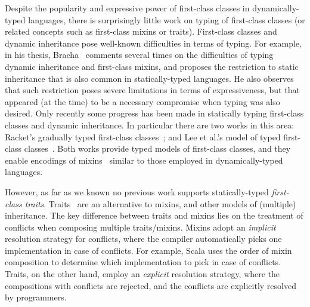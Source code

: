 Despite the popularity and expressive power of first-class classes in dynamically-typed
languages, there is surprisingly little work on typing of first-class
classes (or related concepts such as first-class mixins or traits).
First-class classes and dynamic inheritance pose well-known
difficulties in terms of typing. For example, in his thesis,
Bracha~\citep{bracha1992programming} comments several times on the difficulties of typing
dynamic inheritance and first-class mixins, and proposes the
restriction to static inheritance that is also common in
statically-typed languages. He also observes that such restriction
poses severe limitations in terms of expressiveness, but that appeared
(at the time)
to be a necessary compromise when typing was also desired.
Only recently some progress has been made in statically typing 
first-class classes and dynamic inheritance. In particular there are
two works in this area: Racket's gradually
typed first-class classes~\citep{DBLP:conf/oopsla/TakikawaSDTF12}; and Lee et al.'s model of
typed first-class classes~\citep{DBLP:conf/ecoop/LeeASP15}. Both works provide typed models of
first-class classes, and they enable encodings of mixins~\citep{bracha1990mixin}
similar to those employed in dynamically-typed languages.

However, as far as we known no previous work supports statically-typed
\emph{first-class traits}. Traits~\citep{scharli2003traits} are an alternative to
mixins, and other models of (multiple) inheritance. The key difference between traits and mixins lies on the
treatment of conflicts when
composing multiple traits/mixins. Mixins adopt an
\emph{implicit} resolution strategy for conflicts, where the 
compiler automatically picks one implementation in case of conflicts.
For example, Scala uses the order of mixin composition to determine which 
implementation to pick in case of conflicts.
Traits, on the other hand, employ an \emph{explicit} resolution
strategy, where the compositions with conflicts are rejected, and the
conflicts are explicitly resolved by programmers. 

